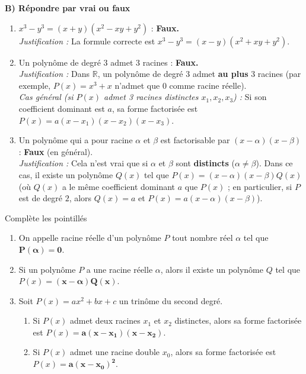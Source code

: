 \documentclass[12pt,a4paper]{article}
\begin{document}
\textbf{B) Répondre par vrai ou faux}
\begin{enumerate}
    \item $x^3 - y^3 = (x + y)(x^2 - xy + y^2)$ : \textbf{Faux.} \\
    \textit{Justification :} La formule correcte est $x^3 - y^3 = (x - y)(x^2 + xy + y^2)$.
    
    \item Un polynôme de degré 3 admet 3 racines : \textbf{Faux.} \\
    \textit{Justification :} Dans $\mathbb{R}$, un polynôme de degré 3 admet \textbf{au plus} 3 racines (par exemple, $P(x) = x^3 + x$ n'admet que $0$ comme racine réelle). \\
    \textit{Cas général (si $P(x)$ admet 3 racines distinctes $x_1, x_2, x_3$) :} Si son coefficient dominant est $a$, sa forme factorisée est $P(x) = a(x - x_1)(x - x_2)(x - x_3)$.
    
    \item Un polynôme qui a pour racine $\alpha$ et $\beta$ est factorisable par $(x - \alpha)(x - \beta)$ : \textbf{Faux} (en général). \\
    \textit{Justification :} Cela n'est vrai que si $\alpha$ et $\beta$ sont \textbf{distincts} ($\alpha \neq \beta$). Dans ce cas, il existe un polynôme $Q(x)$ tel que $P(x) = (x - \alpha)(x - \beta)Q(x)$ (où $Q(x)$ a le même coefficient dominant $a$ que $P(x)$ ; en particulier, si $P$ est de degré $2$, alors $Q(x) = a$ et $P(x) = a(x - \alpha)(x - \beta)$).
\end{enumerate}


Complète les pointillés

\begin{enumerate}
    \item On appelle racine réelle d'un polynôme $P$ tout nombre réel $\alpha$ tel que $\mathbf{P(\alpha) = 0}$.
    \item Si un polynôme $P$ a une racine réelle $\alpha$, alors il existe un polynôme $Q$ tel que $P(x) = \mathbf{(x - \alpha)Q(x)}$.
    \item Soit $P(x) = ax^2 + bx + c$ un trinôme du second degré.
    \begin{enumerate}
        \item Si $P(x)$ admet deux racines $x_1$ et $x_2$ distinctes, alors sa forme factorisée est $P(x) = \mathbf{a(x - x_1)(x - x_2)}$.
        \item Si $P(x)$ admet une racine double $x_0$, alors sa forme factorisée est $P(x) = \mathbf{a(x - x_0)^2}$.
    \end{enumerate}
\end{enumerate}
\end{document}
